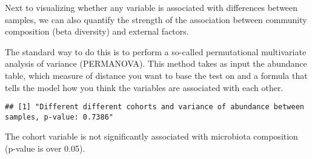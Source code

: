 \documentclass[
]{book}
\newenvironment{Shaded}{\begin{snugshade}}{\end{snugshade}}
\newcommand{\AttributeTok}[1]{\textcolor[rgb]{0.77,0.63,0.00}{#1}}
\newcommand{\CommentTok}[1]{\textcolor[rgb]{0.56,0.35,0.01}{\textit{#1}}}
\newcommand{\DecValTok}[1]{\textcolor[rgb]{0.00,0.00,0.81}{#1}}
\newcommand{\FunctionTok}[1]{\textcolor[rgb]{0.00,0.00,0.00}{#1}}
\newcommand{\NormalTok}[1]{#1}
\newcommand{\OtherTok}[1]{\textcolor[rgb]{0.56,0.35,0.01}{#1}}
\newcommand{\SpecialCharTok}[1]{\textcolor[rgb]{0.00,0.00,0.00}{#1}}
\newcommand{\StringTok}[1]{\textcolor[rgb]{0.31,0.60,0.02}{#1}}
\begin{document}
Next to visualizing whether any variable is associated with
differences between samples, we can also quantify the strength of the
association between community composition (beta diversity) and
external factors.

The standard way to do this is to perform a so-called permutational
multivariate analysis of variance (PERMANOVA). This method takes as
input the abundance table, which measure of distance you want to base
the test on and a formula that tells the model how you think the
variables are associated with each other.

\begin{Shaded}
\end{Shaded}

\begin{verbatim}
## [1] "Different different cohorts and variance of abundance between samples, p-value: 0.7386"
\end{verbatim}

The cohort variable is not significantly associated with
microbiota composition (p-value is over 0.05).
\end{document}
